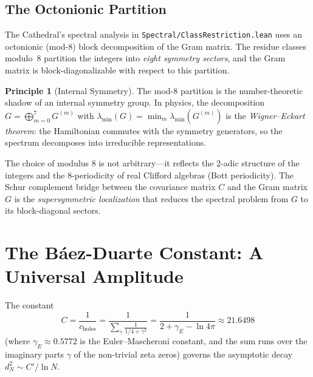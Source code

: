\documentclass[11pt,a4paper]{article}
\theoremstyle{definition}
\newtheorem{principle}[definition]{Principle}
\newcommand{\lean}[1]{\texttt{#1}}
\begin{document}
\subsection{The Octonionic Partition}

The Cathedral's spectral analysis in \lean{Spectral/ClassRestriction.lean}
uses an octonionic (mod-8) block decomposition of the Gram matrix.
The residue classes modulo~8 partition the integers into \emph{eight
symmetry sectors}, and the Gram matrix is block-diagonalizable with
respect to this partition.

\begin{principle}[Internal Symmetry]
The mod-8 partition is the number-theoretic shadow of an internal
symmetry group. In physics, the decomposition $G = \bigoplus_{m=0}^7 G^{(m)}$
with $\lambda_{\min}(G) = \min_m \lambda_{\min}(G^{(m)})$ is the
\emph{Wigner--Eckart theorem}: the Hamiltonian commutes with the
symmetry generators, so the spectrum decomposes into irreducible
representations.

The choice of modulus $8$ is not arbitrary---it reflects the $2$-adic
structure of the integers and the $8$-periodicity of real Clifford
algebras (Bott periodicity). The Schur complement bridge between the
covariance matrix $C$ and the Gram matrix $G$ is the
\emph{supersymmetric localization} that reduces the spectral problem
from $G$ to its block-diagonal sectors.
\end{principle}

\section{The B\'aez-Duarte Constant: A Universal Amplitude}
\label{sec:constant}

The constant
\[
  C = \frac{1}{c_{\text{holes}}}
  = \frac{1}{\displaystyle\sum_\gamma \frac{1}{1/4 + \gamma^2}}
  = \frac{1}{2 + \gamma_E - \ln 4\pi}
  \approx 21.6498
\]
(where $\gamma_E \approx 0.5772$ is the Euler--Mascheroni constant,
and the sum runs over the imaginary parts $\gamma$ of the non-trivial
zeta zeros) governs the asymptotic decay $d_N^2 \sim C'/\ln N$.
\end{document}
